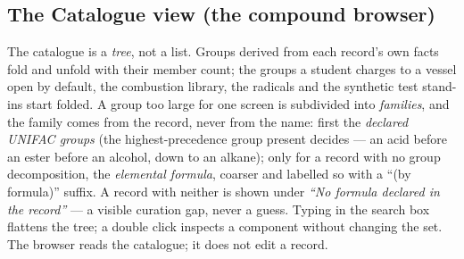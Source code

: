 \documentclass[11pt,a4paper]{article}
\begin{document}
\subsection{The Catalogue view (the compound browser)}\label{sec:explorer-catalogue}
The catalogue is a \emph{tree}, not a list.  Groups derived from each
record's own facts fold and unfold with their member count; the groups a
student charges to a vessel open by default, the combustion library, the
radicals and the synthetic test stand-ins start folded.  A group too large
for one screen is subdivided into \emph{families}, and the family comes from
the record, never from the name: first the \emph{declared UNIFAC groups}
(the highest-precedence group present decides --- an acid before an ester
before an alcohol, down to an alkane); only for a record with no group
decomposition, the \emph{elemental formula}, coarser and labelled so with a
``(by formula)'' suffix.  A record with neither is shown under \emph{``No
formula declared in the record''} --- a visible curation gap, never a guess.
Typing in the search box flattens the tree; a double click inspects a
component without changing the set.  The browser reads the catalogue; it
does not edit a record.
\end{document}
